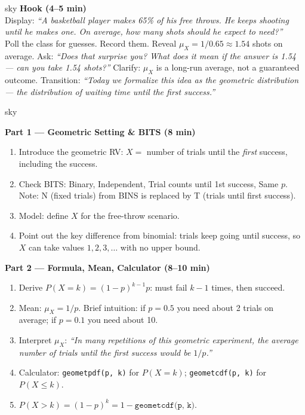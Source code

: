 \documentclass[10pt]{article}
\begin{document}
\begin{skillbox}[Hook]{sky}
    \textbf{Hook (4--5 min)}\\
    Display: \textit{``A basketball player makes 65\% of his free throws.
    He keeps shooting until he makes one. On average, how many shots should
    he expect to need?''}\\[4pt]
    Poll the class for guesses. Record them. Reveal $\mu_X = 1/0.65 \approx 1.54$
    shots on average. Ask: \textit{``Does that surprise you? What does it mean
    if the answer is 1.54 --- can you take 1.54 shots?''} Clarify: $\mu_X$ is a
    long-run average, not a guaranteed outcome.
    Transition: \textit{``Today we formalize this idea as the geometric
    distribution --- the distribution of waiting time until the first success.''}
\end{skillbox}

\begin{skillbox}[Lesson]{sky}
\begin{minipage}[t]{0.48\linewidth}
    \textbf{Part 1 --- Geometric Setting \& BITS (8 min)}
    \begin{enumerate}
        \item Introduce the geometric RV: $X =$ number of trials until the
              \emph{first} success, including the success.
        \item Check BITS: Binary, Independent, Trial counts until 1st success,
              Same $p$. Note: N (fixed trials) from BINS is replaced by T
              (trials until first success).
        \item Model: define $X$ for the free-throw scenario.
        \item Point out the key difference from binomial: trials keep going
              until success, so $X$ can take values $1, 2, 3, \ldots$ with
              no upper bound.
    \end{enumerate}
\end{minipage}
\hfill
\begin{minipage}[t]{0.48\linewidth}
    \textbf{Part 2 --- Formula, Mean, Calculator (8--10 min)}
    \begin{enumerate}
        \item Derive $P(X = k) = (1-p)^{k-1}p$: must fail $k-1$ times, then
              succeed.
        \item Mean: $\mu_X = 1/p$. Brief intuition: if $p = 0.5$ you need
              about 2 trials on average; if $p = 0.1$ you need about 10.
        \item Interpret $\mu_X$: \textit{``In many repetitions of this
              geometric experiment, the average number of trials until the
              first success would be $1/p$.''}
        \item Calculator: \texttt{geometpdf(p, k)} for $P(X = k)$;
              \texttt{geometcdf(p, k)} for $P(X \le k)$.
        \item $P(X > k) = (1-p)^k = 1 - \texttt{geometcdf(p, k)}$.
    \end{enumerate}
\end{minipage}
\end{skillbox}
\end{document}
